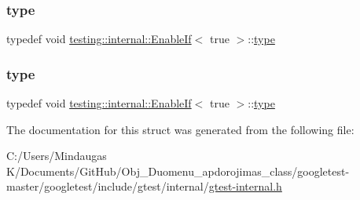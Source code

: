 \mbox{\label{structtesting_1_1internal_1_1_enable_if_3_01true_01_4_a9398d803f1fdd99ff41823746f6299ff}} 
\subsubsection{\texorpdfstring{type}{type}\hspace{0.1cm}{\footnotesize\ttfamily [2/3]}}
{\footnotesize\ttfamily typedef void \mbox{\hyperlink{structtesting_1_1internal_1_1_enable_if}{testing\+::internal\+::\+Enable\+If}}$<$ true $>$\+::\mbox{\hyperlink{structtesting_1_1internal_1_1_enable_if_3_01true_01_4_a9398d803f1fdd99ff41823746f6299ff}{type}}}

\mbox{\label{structtesting_1_1internal_1_1_enable_if_3_01true_01_4_a9398d803f1fdd99ff41823746f6299ff}} 
\subsubsection{\texorpdfstring{type}{type}\hspace{0.1cm}{\footnotesize\ttfamily [3/3]}}
{\footnotesize\ttfamily typedef void \mbox{\hyperlink{structtesting_1_1internal_1_1_enable_if}{testing\+::internal\+::\+Enable\+If}}$<$ true $>$\+::\mbox{\hyperlink{structtesting_1_1internal_1_1_enable_if_3_01true_01_4_a9398d803f1fdd99ff41823746f6299ff}{type}}}



The documentation for this struct was generated from the following file\+:\begin{DoxyCompactItemize}
\item 
C\+:/\+Users/\+Mindaugas K/\+Documents/\+Git\+Hub/\+Obj\+\_\+\+Duomenu\+\_\+apdorojimas\+\_\+class/googletest-\/master/googletest/include/gtest/internal/\mbox{\hyperlink{googletest-master_2googletest_2include_2gtest_2internal_2gtest-internal_8h}{gtest-\/internal.\+h}}\end{DoxyCompactItemize}
